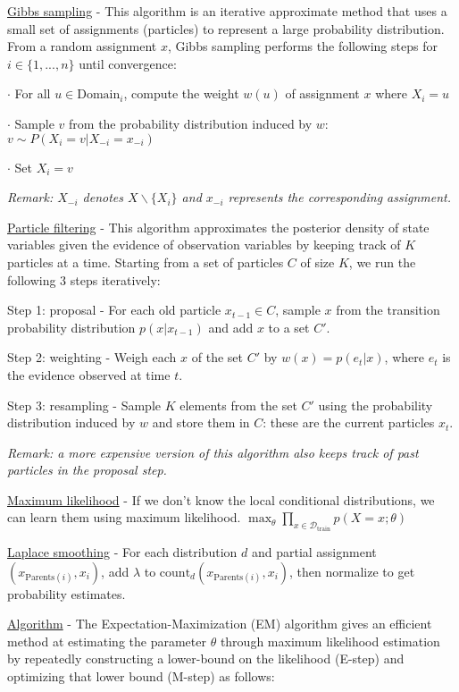 \documentclass[4pt,landscape]{article}
\begin{document}
\begin{multicols*}{4}
 {\tiny \underline{Gibbs sampling} - This algorithm is an iterative approximate method that uses a small set of assignments (particles) to represent a large probability distribution. From a random assignment $x$, Gibbs sampling performs the following steps for $i\in \{1,...,n\}$ until convergence:}\par
 {\tiny $\cdot$ For all $u \in \textrm{Domain}_i$, compute the weight $w(u)$ of assignment $x$ where $X_i = u$}\par
 {\tiny $\cdot$ Sample $v$ from the probability distribution induced by $w$: $v \sim P(X_i = v | X_{-i} = x_{-i})$}\par
 {\tiny $\cdot$ Set $X_i = v$}\par
 {\tiny \textit{Remark: $X_{-i}$ denotes $X \backslash \{X_i\}$ and $x_{-i}$ represents the corresponding assignment.}}\par
 {\tiny \underline{Particle filtering} - This algorithm approximates the posterior density of state variables given the evidence of observation variables by keeping track of $K$ particles at a time. Starting from a set of particles $C$ of size $K$, we run the following 3 steps iteratively:}\par
 {\tiny \textrm{Step 1:} proposal - For each old particle $x_{t-1} \in C$, sample $x$ from the transition probability distribution $p(x | x_{t-1})$ and add $x$ to a set $C'$.}\par
 {\tiny \textrm{Step 2:} weighting - Weigh each $x$ of the set $C'$ by $w(x)=p(e_t|x)$, where $e_t$ is the evidence observed at time $t$.}\par
 {\tiny \textrm{Step 3:} resampling - Sample $K$ elements from the set $C'$ using the probability distribution induced by $w$ and store them in $C$: these are the current particles $x_t$.}\par
 {\tiny \textit{Remark: a more expensive version of this algorithm also keeps track of past particles in the proposal step.}}\par
 {\tiny \underline{Maximum likelihood} - If we don't know the local conditional distributions, we can learn them using maximum likelihood. $\max_\theta\prod_{x\in\mathcal{D}_{\textrm{train}}}p(X=x;\theta)$}\par
 {\tiny \underline{Laplace smoothing} - For each distribution $d$ and partial assignment $(x_{\textrm{Parents}(i)},x_i)$, add $\lambda$ to $\textrm{count}_d(x_{\textrm{Parents}(i)},x_i)$, then normalize to get probability estimates.}\par
 {\tiny \underline{Algorithm} - The Expectation-Maximization (EM) algorithm gives an efficient method at estimating the parameter $\theta$ through maximum likelihood estimation by repeatedly constructing a lower-bound on the likelihood (E-step) and optimizing that lower bound (M-step) as follows:}\par

\end{multicols*}
\end{document}
